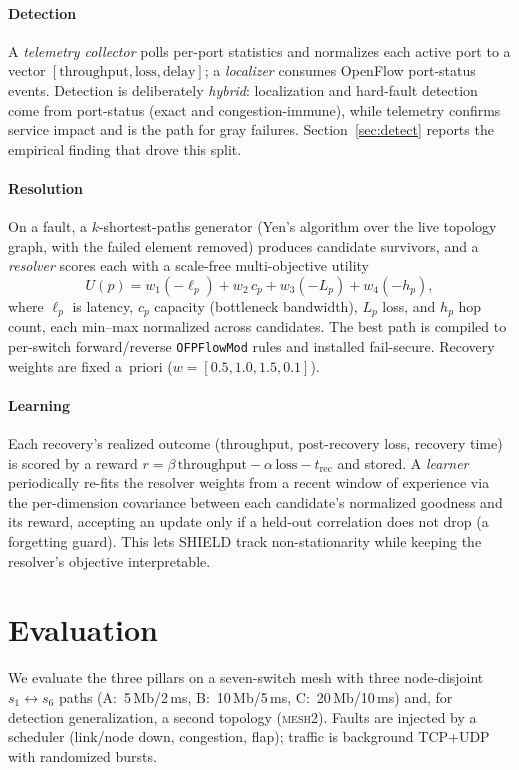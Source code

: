 \documentclass[conference]{IEEEtran}
\begin{document}
\paragraph{Detection}
A \emph{telemetry collector} polls per-port statistics and normalizes each active
port to a vector $[\text{throughput},\text{loss},\text{delay}]$; a \emph{localizer}
consumes OpenFlow port-status events. Detection is deliberately \emph{hybrid}:
localization and hard-fault detection come from port-status (exact and
congestion-immune), while telemetry confirms service impact and is the path for
gray failures. Section~\ref{sec:detect} reports the empirical finding that drove this
split.

\paragraph{Resolution}
On a fault, a $k$-shortest-paths generator (Yen's algorithm over the live topology
graph, with the failed element removed) produces candidate survivors, and a
\emph{resolver} scores each with a scale-free multi-objective utility
\begin{equation}
\label{eq:obj}
U(p) = w_1(-\ell_p) + w_2\, c_p + w_3(-L_p) + w_4(-h_p),
\end{equation}
where $\ell_p$ is latency, $c_p$ capacity (bottleneck bandwidth), $L_p$ loss, and
$h_p$ hop count, each min--max normalized across candidates. The best path is
compiled to per-switch forward/reverse \texttt{OFPFlowMod} rules and installed
fail-secure. Recovery weights are fixed a~priori
($w=[0.5,1.0,1.5,0.1]$). %

\paragraph{Learning}
Each recovery's realized outcome (throughput, post-recovery loss, recovery time) is
scored by a reward $r=\beta\,\text{throughput}-\alpha\,\text{loss}-t_{\text{rec}}$
and stored. A \emph{learner} periodically re-fits the resolver weights from a recent
window of experience via the per-dimension covariance between each candidate's
normalized goodness and its reward, accepting an update only if a held-out
correlation does not drop (a forgetting guard). This lets SHIELD track
non-stationarity while keeping the resolver's objective interpretable.

\section{Evaluation}
We evaluate the three pillars on a seven-switch mesh with three node-disjoint
$s_1\!\leftrightarrow\!s_6$ paths (A:~5\,Mb/2\,ms, B:~10\,Mb/5\,ms, C:~20\,Mb/10\,ms)
and, for detection generalization, a second topology (\textsc{mesh2}). Faults are
injected by a scheduler (link/node down, congestion, flap); traffic is background
TCP+UDP with randomized bursts.
\end{document}
